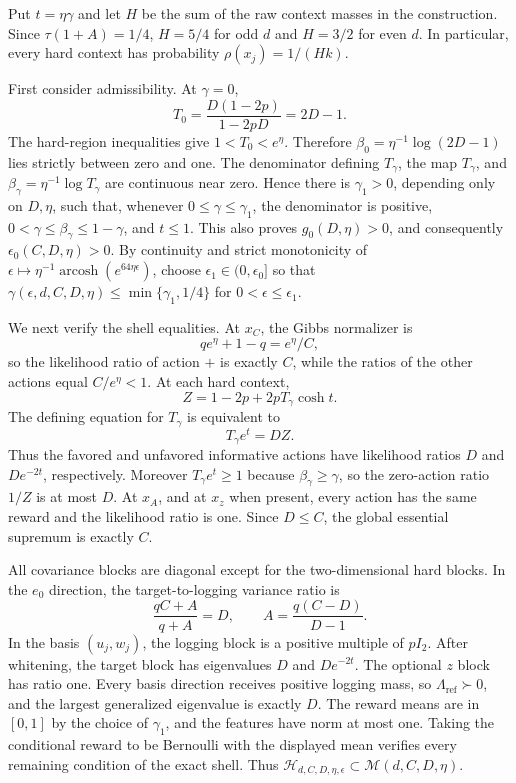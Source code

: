 Put \(t=\eta\gamma\) and let \(H\) be the sum of the raw context masses in the construction. Since \(\tau(1+A)=1/4\), \(H=5/4\) for odd \(d\) and \(H=3/2\) for even \(d\). In particular, every hard context has probability \(\rho(x_j)=1/(Hk)\).

First consider admissibility. At \(\gamma=0\),
\[
T_0=\frac{D(1-2p)}{1-2pD}=2D-1.
\]
The hard-region inequalities give \(1<T_0<e^\eta\). Therefore \(\beta_0=\eta^{-1}\log(2D-1)\) lies strictly between zero and one. The denominator defining \(T_\gamma\), the map \(T_\gamma\), and \(\beta_\gamma=\eta^{-1}\log T_\gamma\) are continuous near zero. Hence there is \(\gamma_1>0\), depending only on \(D,\eta\), such that, whenever \(0\le\gamma\le\gamma_1\), the denominator is positive, \(0<\gamma\le\beta_\gamma\le1-\gamma\), and \(t\le1\). This also proves \(g_0(D,\eta)>0\), and consequently \(\epsilon_0(C,D,\eta)>0\). By continuity and strict monotonicity of \(\epsilon\mapsto\eta^{-1}\operatorname{arcosh}(e^{64\eta\epsilon})\), choose \(\epsilon_1\in(0,\epsilon_0]\) so that \(\gamma(\epsilon,d,C,D,\eta)\le\min\{\gamma_1,1/4\}\) for \(0<\epsilon\le\epsilon_1\).

We next verify the shell equalities. At \(x_C\), the Gibbs normalizer is
\[
q e^\eta+1-q=e^\eta/C,
\]
so the likelihood ratio of action \(+\) is exactly \(C\), while the ratios of the other actions equal \(C/e^\eta<1\). At each hard context,
\[
Z=1-2p+2pT_\gamma\cosh t.
\]
The defining equation for \(T_\gamma\) is equivalent to
\[
T_\gamma e^t=DZ.
\]
Thus the favored and unfavored informative actions have likelihood ratios \(D\) and \(De^{-2t}\), respectively. Moreover \(T_\gamma e^t\ge1\) because \(\beta_\gamma\ge\gamma\), so the zero-action ratio \(1/Z\) is at most \(D\). At \(x_A\), and at \(x_z\) when present, every action has the same reward and the likelihood ratio is one. Since \(D\le C\), the global essential supremum is exactly \(C\).

All covariance blocks are diagonal except for the two-dimensional hard blocks. In the \(e_0\) direction, the target-to-logging variance ratio is
\[
\frac{qC+A}{q+A}=D,
\qquad
A=\frac{q(C-D)}{D-1}.
\]
In the basis \((u_j,w_j)\), the logging block is a positive multiple of \(pI_2\). After whitening, the target block has eigenvalues \(D\) and \(De^{-2t}\). The optional \(z\) block has ratio one. Every basis direction receives positive logging mass, so \(\Lambda_{\mathrm{ref}}\succ0\), and the largest generalized eigenvalue is exactly \(D\). The reward means are in \([0,1]\) by the choice of \(\gamma_1\), and the features have norm at most one. Taking the conditional reward to be Bernoulli with the displayed mean verifies every remaining condition of the exact shell. Thus \(\mathcal H_{d,C,D,\eta,\epsilon}\subset\mathcal M(d,C,D,\eta)\).

